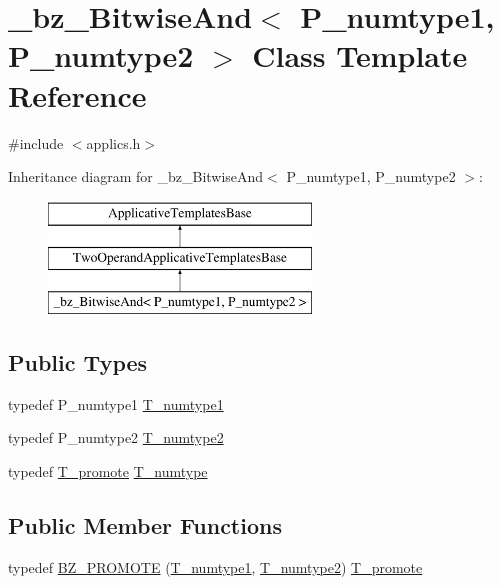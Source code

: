 \hypertarget{class__bz__BitwiseAnd}{}\section{\+\_\+bz\+\_\+\+Bitwise\+And$<$ P\+\_\+numtype1, P\+\_\+numtype2 $>$ Class Template Reference}
\label{class__bz__BitwiseAnd}


{\ttfamily \#include $<$applics.\+h$>$}

Inheritance diagram for \+\_\+bz\+\_\+\+Bitwise\+And$<$ P\+\_\+numtype1, P\+\_\+numtype2 $>$\+:\begin{figure}[H]
\begin{center}
\leavevmode
\includegraphics[height=3.000000cm]{class__bz__BitwiseAnd}
\end{center}
\end{figure}
\subsection*{Public Types}
\begin{DoxyCompactItemize}
\item 
typedef P\+\_\+numtype1 \hyperlink{class__bz__BitwiseAnd_ad481864869838cfb4ef822609e8863ba}{T\+\_\+numtype1}
\item 
typedef P\+\_\+numtype2 \hyperlink{class__bz__BitwiseAnd_ab5a75e5400980ef2ec8f118dbcf4874f}{T\+\_\+numtype2}
\item 
typedef \hyperlink{minmax_8h_aaa88a440c2f0d00798d5b1d42c79308d}{T\+\_\+promote} \hyperlink{class__bz__BitwiseAnd_a392ad6579f509873cdfad1f014dcdc37}{T\+\_\+numtype}
\end{DoxyCompactItemize}
\subsection*{Public Member Functions}
\begin{DoxyCompactItemize}
\item 
typedef \hyperlink{class__bz__BitwiseAnd_a3ce7942eeffb7da7a7725e97e13eee0d}{B\+Z\+\_\+\+P\+R\+O\+M\+O\+T\+E} (\hyperlink{class__bz__BitwiseAnd_ad481864869838cfb4ef822609e8863ba}{T\+\_\+numtype1}, \hyperlink{class__bz__BitwiseAnd_ab5a75e5400980ef2ec8f118dbcf4874f}{T\+\_\+numtype2}) \hyperlink{minmax_8h_aaa88a440c2f0d00798d5b1d42c79308d}{T\+\_\+promote}
\end{DoxyCompactItemize}
